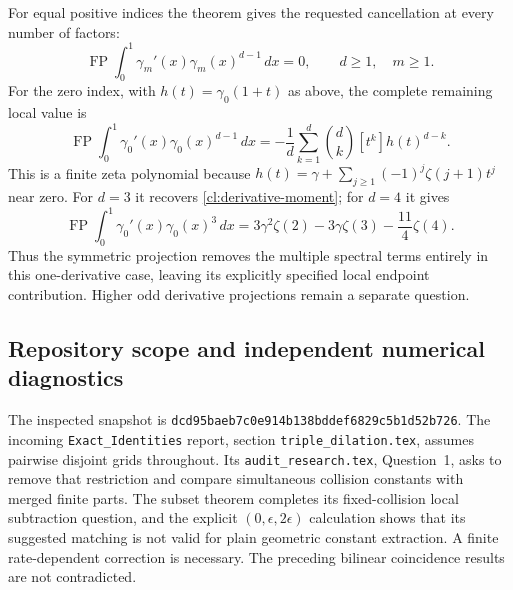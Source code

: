 \documentclass[11pt,a4paper]{article}
\numberwithin{equation}{section}
\theoremstyle{definition}
\theoremstyle{remark}
\DeclareMathOperator{\FP}{FP}
\newcommand{\src}[1]{\nolinkurl{#1}}
\begin{document}
For equal positive indices the theorem gives the requested cancellation
at every number of factors:
\begin{equation}\label{cl:equal-index-cancellation}
 \boxed{\quad
 \FP\int_0^1\gamma_m'(x)\gamma_m(x)^{d-1}\,dx=0,
       \qquad d\ge1,\quad m\ge1.
 \quad}
\end{equation}
For the zero index, with $h(t)=\gamma_0(1+t)$ as above, the complete
remaining local value is
\begin{equation}\label{cl:zero-index-projection}
 \FP\int_0^1\gamma_0'(x)\gamma_0(x)^{d-1}\,dx
 =-\frac1d\sum_{k=1}^d\binom dk[t^k]h(t)^{d-k}.
\end{equation}
This is a finite zeta polynomial because
$h(t)=\gamma+\sum_{j\ge1}(-1)^j\zeta(j+1)t^j$ near zero.
For $d=3$ it recovers \eqref{cl:derivative-moment}; for $d=4$ it gives
\[
 \FP\int_0^1\gamma_0'(x)\gamma_0(x)^3\,dx
 =3\gamma^2\zeta(2)-3\gamma\zeta(3)-\frac{11}{4}\zeta(4).
\]
Thus the symmetric projection removes the multiple spectral terms
entirely in this one-derivative case, leaving its explicitly specified
local endpoint contribution. Higher odd derivative projections remain
a separate question.

\subsection{Repository scope and independent numerical diagnostics}
\label{cl:numerics}

The inspected snapshot is
\texttt{dcd95baeb7c0e914b138bddef6829c5b1d52b726}.
The incoming \src{Exact_Identities} report, section
\texttt{triple\_dilation.tex}, assumes pairwise disjoint grids throughout.
Its \texttt{audit\_research.tex}, Question~1, asks to remove that
restriction and compare simultaneous collision constants with merged
finite parts. The subset theorem completes its fixed-collision local
subtraction question, and the explicit $(0,\epsilon,2\epsilon)$
calculation shows that its suggested matching is not valid for plain
geometric constant extraction. A finite rate-dependent correction
is necessary. The preceding bilinear coincidence results are not
contradicted.
\end{document}
